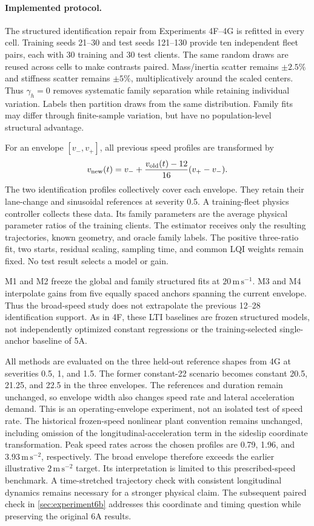 \paragraph{Implemented protocol.}
The structured identification repair from Experiments 4F--4G is refitted in
every cell. Training seeds 21--30 and test seeds 121--130 provide ten independent
fleet pairs, each with 30 training and 30 test clients. The same random draws
are reused across cells to make contrasts paired. Mass/inertia scatter remains
$\pm2.5\%$ and stiffness scatter remains $\pm5\%$, multiplicatively around the
scaled centers. Thus $\gamma_h=0$ removes systematic family separation while
retaining individual variation. Labels then partition draws from the same
distribution. Family fits may differ through finite-sample variation, but
have no population-level structural advantage.

For an envelope $[v_-,v_+]$, all previous speed profiles are transformed by
\begin{equation}
 v_{\rm new}(t)=v_-+\frac{v_{\rm old}(t)-12}{16}(v_+-v_-).
\end{equation}
The two identification profiles collectively cover each envelope. They retain
their lane-change and sinusoidal references at severity 0.5. A training-fleet
physics controller collects these data. Its family parameters are the average
physical parameter ratios of the training clients. The estimator receives only
the resulting trajectories, known geometry, and oracle family labels.
The positive three-ratio fit, two starts, residual scaling, sampling time,
and common LQI weights remain fixed. No test result selects a model or gain.

M1 and M2 freeze the global and family structured fits at
$20\,\mathrm{m\,s^{-1}}$. M3 and M4 interpolate gains from five equally spaced
anchors spanning the current envelope. Thus the broad-speed study does not
extrapolate the previous 12--28 identification support. As in 4F, these LTI
baselines are frozen structured models, not independently optimized constant
regressions or the training-selected single-anchor baseline of 5A.

All methods are evaluated on the three held-out reference shapes from 4G at
severities 0.5, 1, and 1.5. The former constant-22 scenario becomes constant
20.5, 21.25, and 22.5 in the three envelopes. The references and duration remain
unchanged, so envelope width also changes speed rate and lateral acceleration
demand. This is an operating-envelope experiment, not an isolated test of speed
rate. The historical frozen-speed nonlinear plant convention remains unchanged,
including omission of the longitudinal-acceleration term in the sideslip
coordinate transformation.
Peak speed rates across the chosen profiles are 0.79, 1.96, and
$3.93\,\mathrm{m\,s^{-2}}$, respectively. The broad envelope therefore exceeds
the earlier illustrative $2\,\mathrm{m\,s^{-2}}$ target. Its interpretation is
limited to this prescribed-speed benchmark. A time-stretched trajectory check
with consistent longitudinal dynamics remains necessary for a stronger physical
claim.
The subsequent paired check in \cref{sec:experiment6b} addresses this
coordinate and timing question while preserving the original 6A results.

